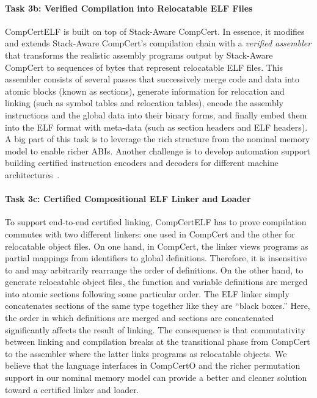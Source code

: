 \paragraph*{Task 3b: Verified Compilation into Relocatable ELF Files}
CompCertELF is built on top of Stack-Aware CompCert. In essence, it
modifies and extends Stack-Aware CompCert's compilation chain with a
\emph{verified assembler} that transforms the realistic assembly
programs output by Stack-Aware CompCert to sequences of bytes that
represent relocatable ELF files.  This assembler consists of several
passes that successively merge code and data into atomic blocks (known
as sections), generate information for relocation and linking (such as
symbol tables and relocation tables), encode the assembly instructions
and the global data into their binary forms, and finally embed them
into the ELF format with meta-data (such as section headers and ELF
headers). A big part of this task is to leverage the rich structure
from the nominal memory model to enable richer ABIs.  Another
challenge is to develop automation support building certified
instruction encoders and decoders for different machine
architectures~\cite{xu21}.

\paragraph*{Task 3c: Certified Compositional ELF Linker and Loader}
To support end-to-end certified linking, CompCertELF has to prove
compilation commutes with two different linkers: one used in CompCert
and the other for relocatable object files. On one hand, in CompCert,
the linker views programs as partial mappings from identifiers to
global definitions. Therefore, it is insensitive to and may
arbitrarily rearrange the order of definitions. On the other hand, to
generate relocatable object files, the function and variable
definitions are merged into atomic sections following some particular
order. The ELF linker simply concatenates sections of the same type
together like they are ``black boxes.''  Here, the order in which
definitions are merged and sections are concatenated significantly
affects the result of linking.  The consequence is that commutativity
between linking and compilation breaks at the transitional phase from
CompCert to the assembler where the latter links programs as
relocatable objects. We believe that the language interfaces in
CompCertO and the richer permutation support in our nominal memory
model can provide a better and cleaner solution toward a certified
linker and loader.


